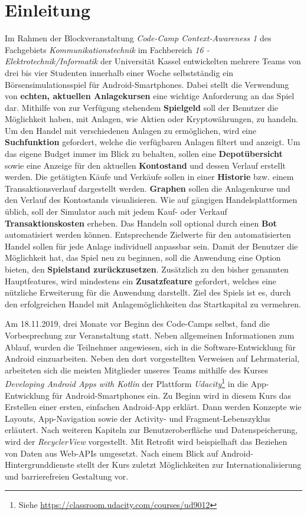 \documentclass[a4paper]{article}
\begin{document}
\section{Einleitung}
\label{sec:introduction}
Im Rahmen der Blockveranstaltung \textit{Code-Camp Context-Awareness 1} des Fachgebiets \textit{Kommunikationstechnik} im Fachbereich \textit{16 - Elektrotechnik/Informatik} der Universität Kassel entwickelten mehrere Teams von drei bis vier Studenten innerhalb einer Woche selbstständig ein Börsensimulationsspiel für Android-Smartphones. Dabei stellt die Verwendung von \textbf{echten, aktuellen Anlagekursen} eine wichtige Anforderung an das Spiel dar. Mithilfe von zur Verfügung stehendem \textbf{Spielgeld} soll der Benutzer die Möglichkeit haben, mit Anlagen, wie Aktien oder Kryptowährungen, zu handeln. Um den Handel mit verschiedenen Anlagen zu ermöglichen, wird eine \textbf{Suchfunktion} gefordert, welche die verfügbaren Anlagen filtert und anzeigt. Um das eigene Budget immer im Blick zu behalten, sollen eine \textbf{Depotübersicht} sowie eine Anzeige für den aktuellen \textbf{Kontostand} und dessen Verlauf erstellt werden. Die getätigten Käufe und Verkäufe sollen in einer \textbf{Historie} bzw. einem Transaktionsverlauf dargestellt werden. \textbf{Graphen} sollen die Anlagenkurse und den Verlauf des Kontostands visualisieren. Wie auf gängigen Handelsplattformen üblich, soll der Simulator auch mit jedem Kauf- oder Verkauf \textbf{Transaktionskosten} erheben. Das Handeln soll optional durch einen \textbf{Bot} automatisiert werden können. Entsprechende Zielwerte für den automatisierten Handel sollen für jede Anlage individuell anpassbar sein. Damit der Benutzer die Möglichkeit hat, das Spiel neu zu beginnen, soll die Anwendung eine Option bieten, den \textbf{Spielstand zurückzusetzen}. Zusätzlich zu den bisher genannten Hauptfeatures, wird mindestens ein \textbf{Zusatzfeature} gefordert, welches eine nützliche Erweiterung für die Anwendung darstellt. Ziel des Spiels ist es, durch den erfolgreichen Handel mit Anlagemöglichkeiten das Startkapital zu vermehren.

Am 18.11.2019, drei Monate vor Beginn des Code-Camps selbst, fand die Vorbesprechung zur Veranstaltung statt. Neben allgemeinen Informationen zum Ablauf, wurden die Teilnehmer angewiesen, sich in die Software-Entwicklung für Android einzuarbeiten. Neben den dort vorgestellten Verweisen auf Lehrmaterial, arbeiteten sich die meisten Mitglieder unseres Teams mithilfe des Kurses \textit{Developing Android Apps with Kotlin} der Plattform \textit{Udacity}\footnote{Siehe \url{https://classroom.udacity.com/courses/ud9012}} in die App-Entwicklung für Android-Smartphones ein. Zu Beginn wird in diesem Kurs das Erstellen einer ersten, einfachen Android-App erklärt. Dann werden Konzepte wie Layouts, App-Navigation sowie der Activity- und Fragment-Lebenszyklus erläutert. Nach weiteren Kapiteln zur Benutzeroberfläche und Datenspeicherung, wird der \textit{RecyclerView} vorgestellt. Mit Retrofit wird beispielhaft das Beziehen von Daten aus Web-APIs umgesetzt. Nach einem Blick auf Android-Hintergrunddienste stellt der Kurs zuletzt Möglichkeiten zur Internationalisierung und barrierefreien Gestaltung vor.
\end{document}
